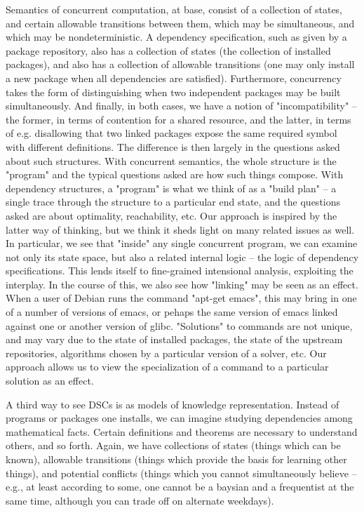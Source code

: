 \documentclass[hoptionsi,review,format=acmsmall]{acmart}
\theoremstyle{definition}
\begin{document}
Semantics of concurrent computation, at base, consist of a collection of states, and certain allowable transitions between them, which may be simultaneous, and which may be nondeterministic. A dependency specification, such as given by a package repository, also has a collection of states (the collection of installed packages), and also has a collection of allowable transitions (one may only install a new package when all dependencies are satisfied). Furthermore, concurrency takes the form of distinguishing when two independent packages may be built simultaneously. And finally, in both cases, we have a notion of "incompatibility" -- the former, in terms of contention for a shared resource, and the latter, in terms of e.g. disallowing that two linked packages expose the same required symbol with different definitions. The difference is then largely in the questions asked about such structures. With concurrent semantics, the whole structure is the "program" and the typical questions asked are how such things compose. With dependency structures, a "program" is what we think of as a "build plan" -- a single trace through the structure to a particular end state, and the questions asked are about optimality, reachability, etc. Our approach is inspired by the latter way of thinking, but we think it sheds light on many related issues as well. In particular, we see that "inside" any single concurrent program, we can examine not only its state space, but also a related internal logic -- the logic of dependency specifications. This lends itself to fine-grained intensional analysis, exploiting the interplay. In the course of this, we also see how "linking" may be seen as an effect. When a user of Debian runs the command "apt-get emacs", this may bring in one of a number of versions of emacs, or pehaps the same version of emacs linked against one or another version of glibc. "Solutions" to commands are not unique, and may vary due to the state of installed packages, the state of the upstream repositories, algorithms chosen by a particular version of a solver, etc. Our approach allows us to view the specialization of a command to a particular solution as an effect.

A third way to see DSCs is as models of knowledge representation. Instead of programs or packages one installs, we can imagine studying dependencies among mathematical facts. Certain definitions and theorems are necessary to understand others, and so forth. Again, we have collections of states (things which can be known), allowable transitions (things which provide the basis for learning other things), and potential conflicts (things which you cannot simultaneously believe -- e.g., at least according to some, one cannot be a baysian and a frequentist at the same time, although you can trade off on alternate weekdays).
\end{document}
